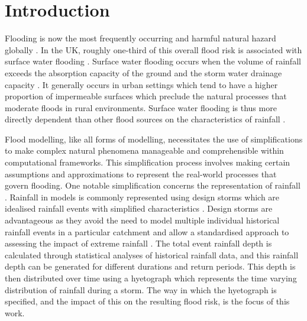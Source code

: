\documentclass[APA,Times2COL]{WileyNJDv5}
\begin{document}
\section{Introduction}\label{sec:introduction}

Flooding is now the most frequently occurring and harmful natural hazard globally \citep{jenkins2018probabilistic, razavi2020anthropocene}. In the UK, roughly one-third of this overall flood risk is associated with surface water flooding \citep{houston2011pluvial}. Surface water flooding occurs when the volume of rainfall exceeds the absorption capacity of the ground and the storm water drainage capacity \citep{archer_characterising_2015}. It generally occurs in urban settings which tend to have a higher proportion of impermeable surfaces which preclude the natural processes that moderate floods in rural environments. Surface water flooding is thus more directly dependent than other flood sources on the characteristics of rainfall \citep{ochoa2015impact}. 

Flood modelling, like all forms of modelling, necessitates the use of simplifications to make complex natural phenomena manageable and comprehensible within computational frameworks. This simplification process involves making certain assumptions and approximations to represent the real-world processes that govern flooding. One notable simplification concerns the representation of rainfall \citep{bardossy2022precipitation}. Rainfall in models is commonly represented using design storms which are idealised rainfall events with simplified characteristics \citep{butler_urban_2004}. Design storms are advantageous as they avoid the need to model multiple individual historical rainfall events in a particular catchment and allow a standardised approach to assessing the impact of extreme rainfall \citep{balbastre2019comparison, marsalek1984design}. The total event rainfall depth is calculated through statistical analyses of historical rainfall data, and this rainfall depth can be generated for different durations and return periods. This depth is then distributed over time using a hyetograph which represents the time varying distribution of rainfall during a storm. The way in which the hyetograph is specified, and the impact of this on the resulting flood risk, is the focus of this work.
\end{document}
